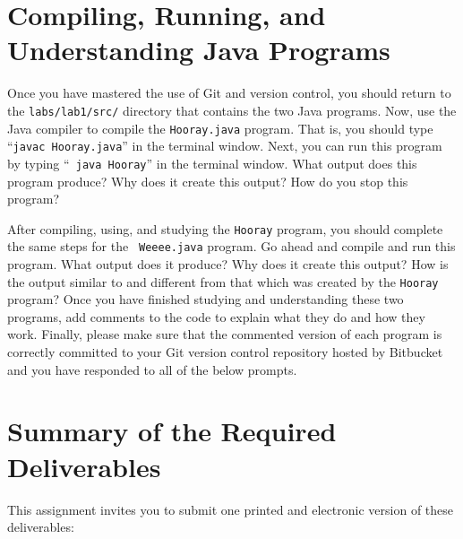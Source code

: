 \section*{Compiling, Running, and Understanding Java Programs}

  Once you have mastered the use of Git and version control, you should return to the {\tt labs/lab1/src/} directory
  that contains the two Java programs. Now, use the Java compiler to compile the {\tt Hooray.java} program.  That is,
  you should type ``{\tt javac Hooray.java}'' in the terminal window.  Next, you can run this program by typing ``{\tt
    java Hooray}'' in the terminal window.  What output does this program produce?  Why does it create this output? How
  do you stop this program?

  After compiling, using, and studying the {\tt Hooray} program, you should complete the same steps for the {\tt
  Weeee.java} program. Go ahead and compile and run this program.  What output does it produce? Why does it create this
  output? How is the output similar to and different from that which was created by the {\tt Hooray} program? Once you
  have finished studying and understanding these two programs, add comments to the code to explain what they do and how
  they work. Finally, please make sure that the commented version of each program is correctly committed to your Git
  version control repository hosted by Bitbucket and you have responded to all of the below prompts.


\section*{Summary of the Required Deliverables}

  This assignment invites you to submit one printed and electronic version of these deliverables:

